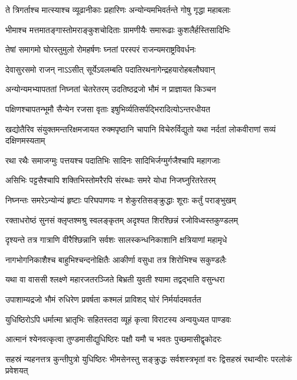 \twolineshloka
{ते त्रिगर्ताश्च मात्स्याश्च व्यूढानीकाः प्रहारिणः}
{अन्योन्यमभिवर्तन्ते गोषु गृद्धा महाबलाः}


\twolineshloka
{भीमाश्च मत्तमातङ्गास्तोमराङ्कुशचोदिताः}
{ग्रामणीयैः समारूढाः कुशलैर्हस्तिसादिभिः}


\twolineshloka
{तेषां समागमो घोरस्तुमुलो रोमहर्षणः}
{घ्नतां परस्परं राजन्यमराष्ट्रविवर्धनः}


\twolineshloka
{देवासुरसमो राजन् नाऽऽसीत् सूर्येऽवलम्बति}
{पदातिरथनागेन्द्रहयारोहबलौघवान्}


\twolineshloka
{अन्योन्यमभ्यापततां निघ्नतां चेतरेतरम्}
{उदतिष्ठद्रजो भौमं न प्राज्ञायत किञ्चन}


\twolineshloka
{पक्षिणश्चापतन्भूमौ सैन्येन रजसा वृताः}
{इषुभिर्व्यतिसर्पद्भिरादित्योऽन्तरधीयत}


\onelineshloka
{खद्योतैरिव संयुक्तमन्तरिक्षमजायत}
\twolineshloka
{रुक्मपृष्ठानि चापानि विचेरुर्विद्युतो यथा}
{नर्दतां लोकवीराणां सव्यं दक्षिणमस्यताम्}


\twolineshloka
{रथा रथैः समाजग्मुः पत्तयश्च पदातिभिः}
{सादिनः सादिभिर्जग्मुर्गजैश्चापि महागजाः}


\twolineshloka
{असिभिः पट्टसैश्चापि शक्तिभिस्तोमरैरपि}
{संरब्धाः समरे योधा निजघ्नुरितरेतरम्}


\twolineshloka
{निघ्नन्तः समरेऽन्योन्यं हृष्टाः परिघपाणयः}
{न शेकुरतिसङ्क्रुद्धाः शूराः कर्तुं पराङ्भुखम्}


\twolineshloka
{रक्ताधरोष्ठं सुनसं क्लृप्तश्मश्रु स्वलङ्कृतम्}
{अदृश्यत शिरश्छिन्नं रजोविध्वस्तकुण्डलम्}


\twolineshloka
{दृश्यन्ते तत्र गात्राणि वीरैश्छिन्नानि सर्वशः}
{सालस्कन्धनिकाशानि क्षत्रियाणां महामृधे}


\twolineshloka
{नागभोगनिकाशैश्च बाहुभिश्चन्दनोक्षितैः}
{आकीर्णा वसुधा तत्र शिरोभिश्च सकुण्डलैः}


\twolineshloka
{यथा वा वाससी श्लक्ष्णे महारजतरञ्जिते}
{बिभ्रती युवती श्यामा तद्वद्भाति वसुन्धरा}


\twolineshloka
{उपाशाम्यद्रजो भौमं रुधिरेण प्रवर्षता}
{कश्मलं प्राविशद् घोरं निर्मर्यादमवर्तत}


\twolineshloka
{युधिष्ठिरोऽपि धर्मात्मा भ्रातृभिः सहितस्तदा}
{व्यूहं कृत्वा विराटस्य अन्वयुध्यत पाण्डवः}


\twolineshloka
{आत्मानं श्येनवत्कृत्वा तुण्डमासीद्युधिष्ठिरः}
{पक्षौ यमौ च भवतः पुच्छमासीद्वृकोदरः}


\threelineshloka
{सहस्रं न्यहनत्तत्र कुन्तीपुत्रो युधिष्ठिरः}
{भीमसेनस्तु सङ्क्रुद्धः सर्वशस्त्रभृतां वरः}
{द्विसहस्रं रथान्वीरः परलोकं प्रवेशयत्}


